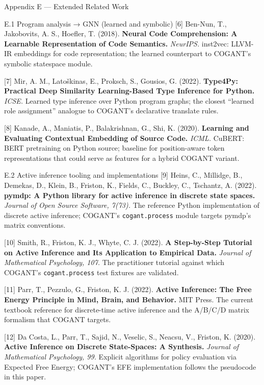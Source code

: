 \documentclass[
  ignorenonframetext,
]{beamer}
\begin{document}
\begin{frame}[fragile]{Appendix E --- Extended Related Work}
\begin{block}{E.1 Program analysis → GNN (learned and symbolic)}
{[}6{]} Ben-Nun, T., Jakobovits, A. S., Hoefler, T. (2018).
\textbf{Neural Code Comprehension: A Learnable Representation of Code
Semantics.} \emph{NeurIPS.} inst2vec: LLVM-IR embeddings for code
representation; the learned counterpart to COGANT's symbolic statespace
module.

{[}7{]} Mir, A. M., Latoškinas, E., Proksch, S., Gousios, G. (2022).
\textbf{Type4Py: Practical Deep Similarity Learning-Based Type Inference
for Python.} \emph{ICSE.} Learned type inference over Python program
graphs; the closest ``learned role assignment'' analogue to COGANT's
declarative translate rules.

{[}8{]} Kanade, A., Maniatis, P., Balakrishnan, G., Shi, K. (2020).
\textbf{Learning and Evaluating Contextual Embedding of Source Code.}
\emph{ICML.} CuBERT: BERT pretraining on Python source; baseline for
position-aware token representations that could serve as features for a
hybrid COGANT variant.
\end{block}

\begin{block}{E.2 Active inference tooling and implementations}
\protect{}\label{e.2-active-inference-tooling-and-implementations}
{[}9{]} Heins, C., Millidge, B., Demekas, D., Klein, B., Friston, K.,
Fields, C., Buckley, C., Tschantz, A. (2022). \textbf{pymdp: A Python
library for active inference in discrete state spaces.} \emph{Journal of
Open Source Software, 7(73).} The reference Python implementation of
discrete active inference; COGANT's \texttt{cogant.process} module
targets pymdp's matrix conventions.

{[}10{]} Smith, R., Friston, K. J., Whyte, C. J. (2022). \textbf{A
Step-by-Step Tutorial on Active Inference and Its Application to
Empirical Data.} \emph{Journal of Mathematical Psychology, 107.} The
practitioner tutorial against which COGANT's \texttt{cogant.process}
test fixtures are validated.

{[}11{]} Parr, T., Pezzulo, G., Friston, K. J. (2022). \textbf{Active
Inference: The Free Energy Principle in Mind, Brain, and Behavior.} MIT
Press. The current textbook reference for discrete-time active inference
and the A/B/C/D matrix formalism that COGANT targets.

{[}12{]} Da Costa, L., Parr, T., Sajid, N., Veselic, S., Neacsu, V.,
Friston, K. (2020). \textbf{Active Inference on Discrete State-Spaces: A
Synthesis.} \emph{Journal of Mathematical Psychology, 99.} Explicit
algorithms for policy evaluation via Expected Free Energy; COGANT's EFE
implementation follows the pseudocode in this paper.


\end{block}
\end{frame}
\end{document}
